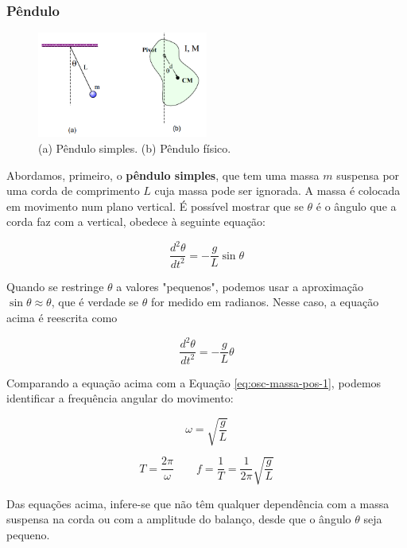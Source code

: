 \subsubsection{Pêndulo}

\begin{figure}[h!]
    \centering
    \includegraphics[width=0.5\textwidth]{10/fig/pendulos.png}
    \caption{(a) Pêndulo simples. (b) Pêndulo físico.}
\end{figure}

Abordamos, primeiro, o \textbf{pêndulo simples}, que tem uma massa $m$ suspensa por uma corda de comprimento $L$ cuja massa pode ser ignorada. A massa é colocada em movimento num plano vertical. É possível mostrar que se $\theta$ é o ângulo que a corda faz com a vertical, obedece à seguinte equação:

\begin{equation}
    \frac{d^2\theta}{dt^2}=-\frac{g}{L}\sin\theta
\end{equation}

Quando se restringe $\theta$ a valores "pequenos", podemos usar a aproximação $\sin \theta \approx \theta$, que é verdade se $\theta$ for medido em radianos. Nesse caso, a equação acima é reescrita como

\begin{equation}
    \frac{d^2\theta}{dt^2}=-\frac{g}{L}\theta
\end{equation}

Comparando a equação acima com a Equação \ref{eq:osc-massa-pos-1}, podemos identificar a frequência angular do movimento:

\begin{equation}
    \omega=\sqrt{\frac{g}{L}}
\end{equation}

\begin{equation}
    T=\frac{2\pi}{\omega} \qquad f=\frac{1}{T}=\frac{1}{2\pi}\sqrt{\frac{g}{L}}
\end{equation}

Das equações acima, infere-se que não têm qualquer dependência com a massa suspensa na corda ou com a amplitude do balanço, desde que o ângulo $\theta$ seja pequeno.

